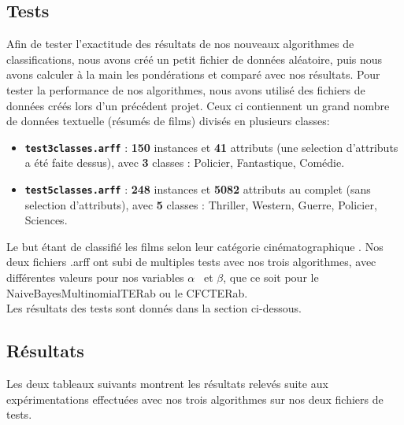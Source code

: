 \documentclass{article}
\begin{document}
\subsection{Tests}
Afin de tester l'exactitude des résultats de nos nouveaux algorithmes de classifications, nous avons créé un petit fichier de données aléatoire, puis nous avons calculer à la main les pondérations et comparé avec nos résultats. 
\bigskip
Pour tester la performance de nos algorithmes, nous avons utilisé des fichiers de données créés lors d'un précédent projet. Ceux ci contiennent un grand nombre de données textuelle (résumés de films) divisés en plusieurs classes:
\begin{itemize}
\item \texttt{\textbf{test3classes.arff}} : \textbf{150} instances et \textbf{41} attributs (une selection d'attributs a été faite dessus), avec \textbf{3} classes : Policier, Fantastique, Comédie.
\item \texttt{\textbf{test5classes.arff}} : \textbf{248} instances et \textbf{5082} attributs au complet (sans selection d'attributs), avec \textbf{5} classes : Thriller, Western, Guerre, Policier, Sciences.
\end{itemize}
Le but étant de classifié les films selon leur catégorie cinématographique .
Nos deux fichiers .arff ont subi de multiples tests avec nos trois algorithmes, avec différentes valeurs pour nos variables $\alpha$ \ et $\beta$, que ce soit pour le NaiveBayesMultinomialTERab ou le CFCTERab.\\
Les résultats des tests sont donnés dans la section ci-dessous.

\subsection{Résultats}
Les deux tableaux suivants montrent les résultats relevés suite aux expérimentations effectuées avec nos trois algorithmes sur nos deux fichiers de tests.
\end{document}
